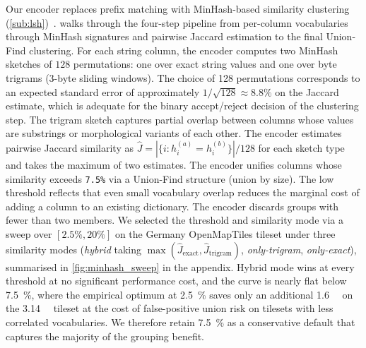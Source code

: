 {\begin{sloppypar}
    Our encoder replaces prefix matching with MinHash-based similarity clustering (\cref{sub:lsh})~\cite{broderResemblanceContainmentDocuments1998}.
     walks through the four-step pipeline from per-column vocabularies through MinHash signatures and pairwise Jaccard estimation to the final Union-Find clustering.
    For each string column, the encoder computes two MinHash sketches of $128$ permutations: one over exact string values and one over byte trigrams (3-byte sliding windows).
    The choice of 128 permutations corresponds to an expected standard error of approximately $1/\sqrt{128} \approx 8.8\%$ on the Jaccard estimate, which is adequate for the binary accept/reject decision of the clustering step.
    The trigram sketch captures partial overlap between columns whose values are substrings or morphological variants of each other.
    The encoder estimates pairwise Jaccard similarity as $\hat{J} = |\{i : h_i^{(a)} = h_i^{(b)}\}| / 128$ for each sketch type and takes the maximum of two estimates.
    The encoder unifies columns whose similarity exceeds \texttt{7.5\%} via a Union-Find structure (union by size).
The low threshold reflects that even small vocabulary overlap reduces the marginal cost of adding a column to an existing dictionary.
    The encoder discards groups with fewer than two members.
    We selected the threshold and similarity mode via a sweep over $[2.5\%, 20\%]$ on the Germany OpenMapTiles tileset under three similarity modes (\emph{hybrid} taking $\max(\hat{J}_\text{exact}, \hat{J}_\text{trigram})$, \emph{only-trigram}, \emph{only-exact}), summarised in \cref{fig:minhash_sweep} in the appendix.
    Hybrid mode wins at every threshold at no significant performance cost, and the curve is nearly flat below \qty{7.5}{\percent}, where the empirical optimum at \qty{2.5}{\percent} saves only an additional \qty{1.6}{\mega\byte} on the \qty{3.14}{\giga\byte} tileset at the cost of false-positive union risk on tilesets with less correlated vocabularies.
    We therefore retain \qty{7.5}{\percent} as a conservative default that captures the majority of the grouping benefit.
\end{sloppypar}

\DeclareRobustCommand{\circled}[1]{\tikz[baseline=(char.base)]{\node[circle, draw, inner sep=1pt, font=\scriptsize\bfseries] (char) {#1};}}

}
